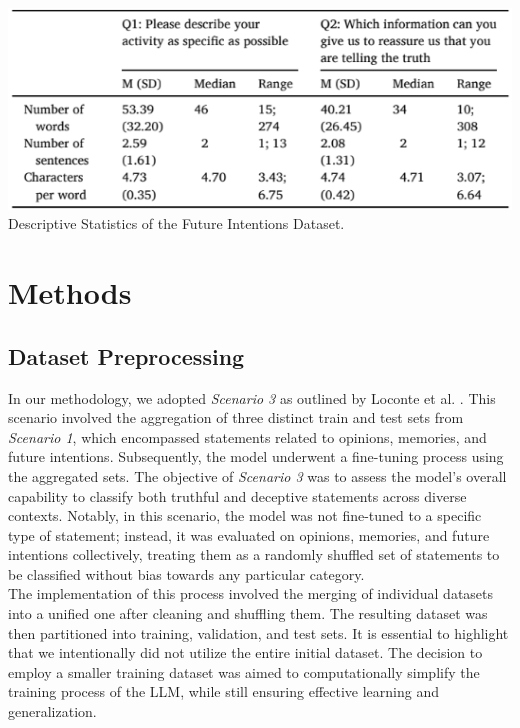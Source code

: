 \documentclass[10pt,twocolumn,letterpaper]{article}
\begin{document}
\begin{center}
    \includegraphics[scale=0.65]{img/future_intentions_dataset_statistics.png} \\
    \small {Descriptive Statistics of the Future Intentions Dataset.} 
\end{center}


\section{Methods}

\subsection{Dataset Preprocessing}

In our methodology, we adopted \textit{Scenario 3} as outlined by Loconte et al. \cite{Loconte}. 
This scenario involved the aggregation of three distinct train and test sets from \textit{Scenario 1}, 
which encompassed statements related to opinions, memories, and future intentions. Subsequently, 
the model underwent a fine-tuning process using the aggregated sets. 
The objective of \textit{Scenario 3} was to assess the model's overall capability to classify both truthful and deceptive 
statements across diverse contexts. Notably, in this scenario, the model was not fine-tuned to a specific type 
of statement; instead, it was evaluated on opinions, memories, and future intentions collectively, 
treating them as a randomly shuffled set of statements to be classified without bias towards any particular category. \\

The implementation of this process involved the merging of individual datasets into a unified one after cleaning and shuffling them.
The resulting dataset was then partitioned into training, validation, and test sets. It is essential 
to highlight that we intentionally did not utilize the entire initial dataset. The decision to employ a smaller 
training dataset was aimed to computationally simplify the training process of the LLM, while still ensuring effective learning and generalization. \\
\end{document}
